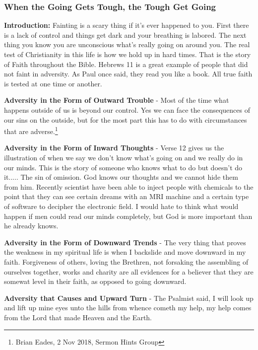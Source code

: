 \subsubsection{When the Going Gets Tough, the Tough Get Going}
\textbf{Introduction:} Fainting is a scary thing if it's ever happened to you. First there is a lack of control and things get dark and your breathing is labored. The next thing you know you are unconscious what's really going on around you. The real test of Christianity in this life is how we hold up in hard times. That is the story of Faith throughout the Bible. Hebrews 11 is a great example of people that did not faint in adversity. As Paul once said, they read you like a book.  All true faith is tested at one time or another.\\
\begin{compactenum}[I.][5]
    \item \textbf{Adversity in the Form of Outward Trouble} - Most of the time what happens outside of us is beyond our control. Yes we can face the consequences of our sins on the outside, but for the most part this has to do with circumstances that are adverse.\footnote{Brian Eades, 2 Nov 2018, Sermon Hints Group}
    \item \textbf{Adversity in the Form of Inward Thoughts} - Verse 12 gives us the illustration of when we say we don't know what's going on and we really do in our minds. This is the story of someone who knows what to do but doesn't do it..... The sin of omission. God knows our thoughts and we cannot hide them from him. Recently scientist have been able to inject people with chemicals to the point that they can see certain dreams with an MRI machine and a certain type of software to decipher the electronic field. I would hate to think what would happen if men could read our minds completely, but God is more important than he already knows.
    \item \textbf{Adversity in the Form of Downward Trends} - The very thing that proves the weakness in my spiritual life is when I backslide and move downward in my faith.  Forgiveness of others, loving the Brethren, not forsaking the assembling of ourselves together, works and charity are all evidences for a believer that they are somewat level in their faith, as opposed to going downward.
    \item \textbf{Adversity that Causes and Upward Turn} - The Psalmist said, I will look up and lift up mine eyes unto the hills from whence cometh my help, my help comes from the Lord that made Heaven and the Earth.
\end{compactenum}

